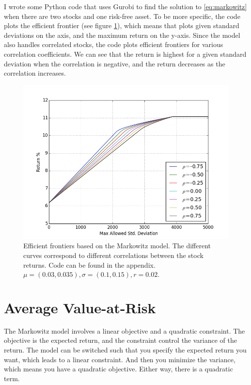 \documentclass{amsart}
\theoremstyle{definition}
\theoremstyle{remark}
\begin{document}
I wrote some Python code that uses Gurobi to find the solution to \ref{eq:markowitz} when there are two stocks and one risk-free asset. To be more specific, the code plots the efficient frontier (see figure \ref{fig:markowitz}), which means that plots given standard deviations on the axis, and the maximum return on the y-axis. Since the model also handles correlated stocks, the code plots efficient frontiers for various correlation coefficients. We can see that the return is highest for a given standard deviation when the correlation is negative, and the return decreases as the correlation increases.
\begin{figure}
\centering
\includegraphics[scale=0.5]{markowitz.png}
\caption{Efficient frontiers based on the Markowitz model. The different curves correspond to different correlations between the stock returns.  Code can be found in the appendix. $\mu = (0.03, 0.035), \sigma=(0.1, 0.15), r = 0.02$.}
\label{fig:markowitz}
\end{figure}

\section{Average Value-at-Risk}
The Markowitz model involves a linear objective and a quadratic constraint. The objective is the expected return, and the constraint control the variance of the return. The model can be switched such that you specify the expected return you want, which leads to a linear constraint. And then you minimize the variance, which means you have a quadratic objective. Either way, there is a quadratic term.
\end{document}
